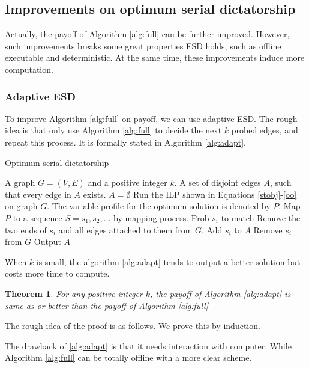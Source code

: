 \documentclass[letterpaper]{article}
\newtheorem{theorem}{Theorem}%
\begin{document}
\subsection{Improvements on optimum serial dictatorship}
Actually, the payoff of Algorithm \ref{alg:full} can be further improved.
However, such improvements breaks some great properties ESD holds, such as offline executable and deterministic.
At the same time, these improvements induce more computation.

\subsubsection{Adaptive ESD}
To improve Algorithm \ref{alg:full} on payoff, we can use adaptive ESD.
The rough idea is that only use Algorithm \ref{alg:full} to decide the next $k$ probed edges, and repeat this process. It is formally stated in Algorithm \ref{alg:adapt}.

\begin{algorithm}
	\caption{Optimum serial dictatorship}
	\label{alg:adapt}
	\begin{algorithmic}[1]
		\Require
		A graph $G=(V,E)$ and a positive integer $k$.
		\Ensure A set of disjoint edges $A$, such that every edge in $A$ exists.
		\State $A=\emptyset$
		\State Run the ILP shown in Equations \ref{stobj}-\ref{oo} on graph $G$. The variable profile for the optimum solution is denoted by $P$. 
		\State Map $P$ to a sequence $S=s_1,s_2,\ldots$ by mapping process. 
		\State Prob $s_i$ to match
		\State Remove the two ends of $s_i$ and all edges attached to them from $G$.
		\State Add $s_i$ to $A$
		\Else
		\State Remove $s_i$ from $G$
		\EndIf
		\EndIf
		\EndFor
		\EndWhile
		\State Output $A$
	\end{algorithmic}
\end{algorithm}

When $k$ is small, the algorithm \ref{alg:adapt} tends to output a better solution but costs more time to compute. 
\begin{theorem}
	For any positive integer $k$, the payoff of Algorithm \ref{alg:adapt} is same as or better than the payoff of Algorithm \ref{alg:full}
\end{theorem}
The rough idea of the proof is as follows. We prove this by induction. 

The drawback of \ref{alg:adapt} is that it needs interaction with computer.
While Algorithm \ref{alg:full} can be totally offline with a more clear scheme.
\end{document}
